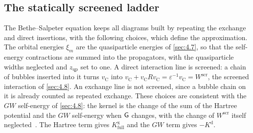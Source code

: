 \subsection*{The statically screened ladder}

The Bethe--Salpeter equation keeps all diagrams built by repeating the exchange and direct insertions, with the following choices, which define the approximation. The orbital energies $\xi_m$ are the quasiparticle energies of \cref{sec:4.7}, so that the self-energy contractions are summed into the propagators, with the quasiparticle widths neglected and $z_{\mathrm{qp}}$ set to one. A direct interaction line is screened: a chain of bubbles inserted into it turns $v_{\mathrm{C}}$ into $v_{\mathrm{C}} + v_{\mathrm{C}}Rv_{\mathrm{C}} = \varepsilon^{-1}v_{\mathrm{C}} = W^{\mathrm{scr}}$, the screened interaction of \cref{sec:4.8}. An exchange line is not screened, since a bubble chain on it is already counted as repeated exchange. These choices are consistent with the $GW$ self-energy of \cref{sec:4.8}: the kernel is the change of the sum of the Hartree potential and the $GW$ self-energy when $\mathsf{G}$ changes, with the change of $W^{\mathrm{scr}}$ itself neglected~\cite{hanke1980many,strinati1988application}. The Hartree term gives $K^{\mathrm{x}}_{\mathrm{full}}$ and the $GW$ term gives $-K^{\mathrm{d}}$.

